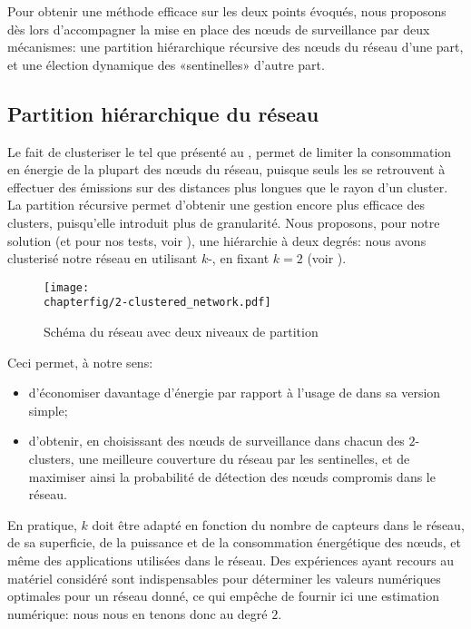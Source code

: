 Pour obtenir une méthode efficace sur les deux points évoqués, nous proposons dès lors d'accompagner la mise en place des nœuds de surveillance par deux mécanismes: une partition hiérarchique récursive des nœuds du réseau d'une part, et une élection dynamique des «sentinelles» d'autre part.

    \subsection{Partition hiérarchique du réseau}

Le fait de clusteriser le \rc tel que présenté au ,  permet de limiter la consommation en énergie de la plupart des nœuds du réseau, puisque seuls les \chs se retrouvent à effectuer des émissions sur des distances plus longues que le rayon d'un cluster.
La partition récursive permet d'obtenir une gestion encore plus efficace des clusters, puisqu'elle introduit plus de granularité.
Nous proposons, pour notre solution (et pour nos tests, voir ), une hiérarchie à deux degrés: nous avons clusterisé notre réseau en utilisant $k$-\leach, en fixant $k=2$ (voir ).
\begin{figure}[ht]
    \centering
    \texttt{[image: \\chapterfig/2-clustered\_network.pdf]}
    \caption{Schéma du réseau avec deux niveaux de partition}\label{sa:fig:network}
\end{figure}
Ceci permet, à notre sens:
\begin{itemize}
    \item d'économiser davantage d'énergie par rapport à l'usage de \leach dans sa version simple;
    \item d'obtenir, en choisissant des nœuds de surveillance dans chacun des $2$-clusters, une meilleure couverture du réseau par les sentinelles, et de maximiser ainsi la probabilité de détection des nœuds compromis dans le réseau.
\end{itemize}
En pratique, $k$ doit être adapté en fonction du nombre de capteurs dans le réseau, de sa superficie, de la puissance et de la consommation énergétique des nœuds, et même des applications utilisées dans le réseau.
Des expériences ayant recours au matériel considéré sont indispensables pour déterminer les valeurs numériques optimales pour un réseau donné, ce qui empêche de fournir ici une estimation numérique: nous nous en tenons donc au degré $2$.


